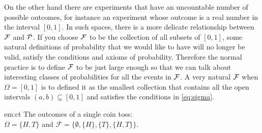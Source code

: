 \begin{remark}\label{re:nonatural}
     On the other hand there are experiments that have an uncountable number of possible outcomes, for instance an experiment whose outcome is a real number in the interval $[0,1]$. In such spaces, there is a more delicate relationship between $\mathcal{F}$ and $\mathcal{P}$. If you choose $\mathcal{F}$ to be the collection of all subsets of $[0,1]$, some natural definitions of probability that we would like to have will no longer be valid, satisfy the conditions and axioms of probability. Therefore the normal practice is to define $\mathcal{F}$ to be just large enough so that we can talk about interesting classes of probabilities for all the events in $\mathcal{F}$. A very natural $\mathcal{F}$ when $\Omega =[0,1]$ is to defined it as the smallest collection that contains all the open intervals $(a,b) \subseteq [0,1]$ and satisfies the conditions in \eqref{eq:sigma}.
\end{remark}



\begin{exmp}{em:ct} The outcomes of a single coin toss:\\
 $\Omega = \{H,T\}$ and $\mathcal{F} = \{ \emptyset, \{H\}, \{T\}, \{H,T\}\}$.
\end{exmp}

